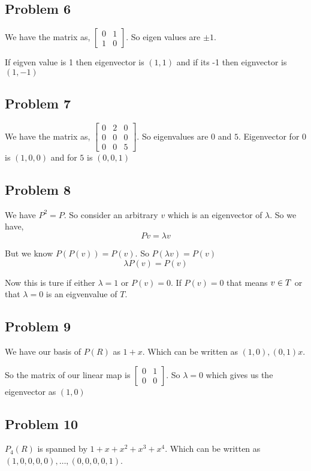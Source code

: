 \documentclass[a4paper]{report}
\begin{document}
\subsection*{Problem 6}
We have the matrix as, $ \begin{bmatrix} 0 & 1 \\ 1 & 0  \end{bmatrix}$. So eigen values are $\pm 1$. 

If eigven value is 1 then eigenvector is $(1,1)$ and if its -1 then eignvector is  $(1,-1)$


\subsection*{Problem 7}
We have the matrix as, $ \begin{bmatrix} 0 & 2 & 0 \\ 0 & 0 & 0 \\ 0 & 0 & 5  \end{bmatrix}$. So eigenvalues are $0$ and $5$. Eigenvector for $0$ is $(1,0,0)$ and for  $5$ is $(0,0,1)$


\subsection*{Problem 8}
We have $P^2=P$. So consider an arbitrary $v$ which is an eigenvector of $\lambda$. So we have, 
$$ Pv = \lambda v $$ 

But we know $P(P(v)) = P(v)$. So  $P(\lambda v) = P(v)$ 
$$ \lambda P(v) = P(v) $$ 

Now this is ture if either $\lambda = 1$ or $P(v) = 0$. If $P(v) = 0$ that means $v \in \null T$ or that $\lambda = 0$ is an eigvenvalue of $T$.





\subsection*{Problem 9}
We have our basis of $P(R)$ as $1 + x$. Which can be written as  $(1,0),(0,1)x$.

So the matrix of our linear map is  $\begin{bmatrix} 0 & 1 \\ 0 & 0 \end{bmatrix}$. So $\lambda = 0$ which gives us the eigenvector as $(1,0)$

\subsection*{Problem 10}
 $P_4(R)$ is spanned by $1 + x + x^2 + x^{3} + x^4$. Which can be written as $(1,0,0,0,0),\dots,(0,0,0,0,1)$.
\end{document}
